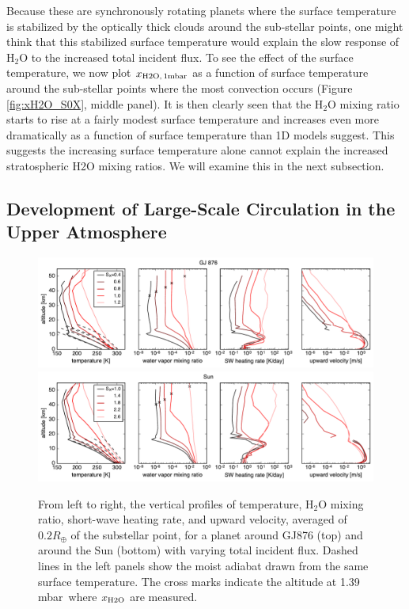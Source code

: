 \documentclass[11pt,numberedappendix,twocolappendix,]{emulateapj}
\def\water{H$_2$O }
\def\xwater{$x_{\rm H2O,\,1mbar}$ }
\def\preslevel{1.39 mbar\ }
\begin{document}
Because these are synchronously rotating planets where the surface temperature is stabilized by the optically thick clouds around the sub-stellar points, one might think that this stabilized surface temperature would explain the slow  response of \water to the increased total incident flux. 
To see the effect of the surface temperature, we now plot \xwater as a function of surface temperature around the sub-stellar points where the most convection occurs (Figure \ref{fig:xH2O_S0X}, middle panel). 
It is then clearly seen that the \water mixing ratio starts to rise at a fairly modest surface temperature and increases even more dramatically as a function of surface temperature than 1D models suggest. 
This suggests the increasing surface temperature alone cannot explain the increased stratospheric H2O mixing ratios. 
We will examine this in the next subsection. 

\subsection{Development of Large-Scale Circulation in the Upper Atmosphere}
\label{ss:result_omega}


\begin{figure}[htb]
    \begin{center}
    \includegraphics[width=1\hsize]{fig/AqOH0TLS_GJ876_temp_xH2O_vz_heat.pdf}
    \includegraphics[width=1\hsize]{fig/AqOH0TLS_Sun_temp_xH2O_vz_heat.pdf}
    \end{center}
\caption{From left to right, the vertical profiles of temperature, \water mixing ratio, short-wave heating rate, and upward velocity, averaged of $0.2R_{\oplus }$ of the substellar point, for a planet around GJ876 (top) and around the Sun (bottom) with varying total incident flux. Dashed lines in the left panels show the moist adiabat drawn from the same surface temperature. The cross marks indicate the altitude at \preslevel where  $x_{\rm H2O}$ are measured. }
\label{fig:AqOH0TLS_GJ876_temp_xH2O_vz_heat}
\end{figure}
\end{document}
